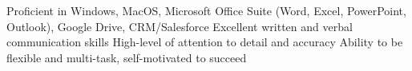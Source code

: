 
\begin{cvskills}
\cvskill
{}
{Proficient in Windows, MacOS, Microsoft Office Suite (Word, Excel, PowerPoint, Outlook), Google Drive, CRM/Salesforce}
\cvskill
{}
{Excellent written and verbal communication skills}
\cvskill
{}
{High-level of attention to detail and accuracy}
\cvskill
{}
{Ability to be flexible and multi-task, self-motivated to succeed}

\end{cvskills}
